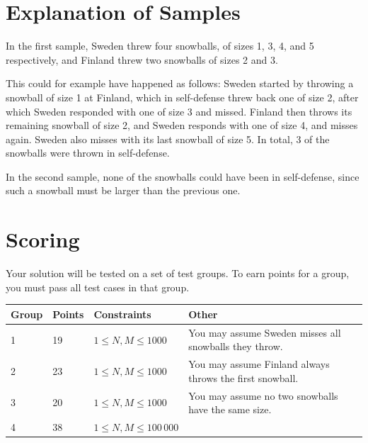 \section*{Explanation of Samples}

In the first sample, Sweden threw four snowballs, of sizes 1, 3, 4, and 5 respectively, and Finland threw two snowballs of sizes 2 and 3.

This could for example have happened as follows: Sweden started by throwing a snowball of size 1 at Finland, which in self-defense threw back one of size 2, after which Sweden responded with one of size 3 and missed.
Finland then throws its remaining snowball of size 2, and Sweden responds with one of size 4, and misses again. Sweden also misses with its last snowball of size 5. In total, 3 of the snowballs were thrown in self-defense.

In the second sample, none of the snowballs could have been in self-defense, since such a snowball must be larger than the previous one.

\section*{Scoring}

Your solution will be tested on a set of test groups. To earn points for a group, you must pass all test cases in that group.

\begin{tabular}{| l | l | l | l |}
\hline
Group & Points & Constraints & Other \\ \hline
1     & 19         &  $1 \le N,M \le 1000$ & You may assume Sweden misses all snowballs they throw. \\ \hline
2     & 23         &  $1 \le N,M \le 1000$ & You may assume Finland always throws the first snowball. \\ \hline
3     & 20         &  $1 \le N,M \le 1000$ & You may assume no two snowballs have the same size. \\ \hline
4     & 38         &  $1 \le N,M \le 100\,000$ & \\ \hline
\end{tabular}

